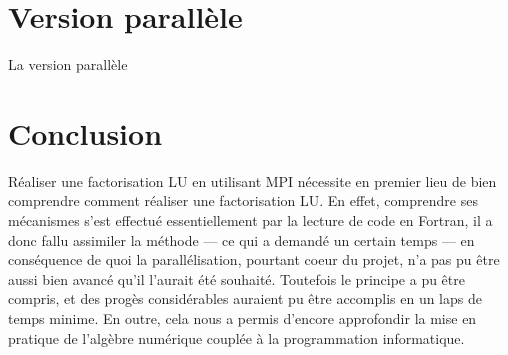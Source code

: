 \documentclass[a4paper,11pt]{article}
\begin{document}
\section{Version parallèle}

La version parallèle 

\section{Conclusion}

Réaliser une factorisation LU en utilisant MPI nécessite en premier lieu de bien comprendre comment réaliser une factorisation LU. En effet, comprendre ses mécanismes s'est effectué essentiellement par la lecture de code en Fortran, il a donc fallu assimiler la méthode --- ce qui a demandé un certain temps --- en conséquence de quoi la parallélisation, pourtant coeur du projet, n'a pas pu être aussi bien avancé qu'il l'aurait été souhaité. Toutefois le principe a pu être compris, et des progès considérables auraient pu être accomplis en un laps de temps minime. En outre, cela nous a permis d'encore approfondir la mise en pratique de l'algèbre numérique couplée à la programmation informatique.
\end{document}
